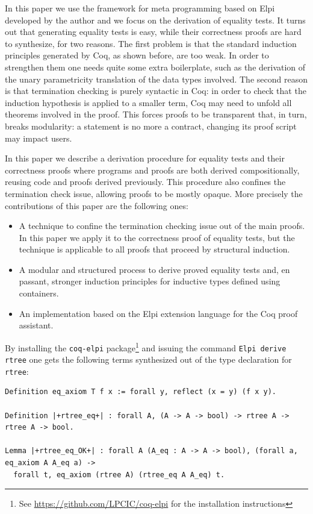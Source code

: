 \documentclass[a4paper,UKenglish,cleveref, autoref]{lipics-v2019}
\begin{document}
In this paper we use the framework for meta programming based on
Elpi~\cite{dunchev:hal-01176856,tassi:hal-01637063} developed by the
author and we focus on the derivation of equality tests.
It turns out that generating equality tests is easy,
while their correctness proofs are hard to synthesize, for two reasons. 
The first problem is that 
the standard induction principles generated by Coq, as shown
before, are too weak. In order to strengthen them one needs quite some extra
boilerplate, such as the derivation of the unary parametricity
translation of the data types involved.
The second reason is that termination checking
is purely syntactic in Coq: %
in order to check that the induction
hypothesis is applied to a smaller term, Coq may need to unfold all
theorems involved in the proof. This forces proofs to
be transparent that, in turn, breaks modularity: a statement is no more a
contract, changing its proof script may impact users.

In this paper we describe a derivation procedure for equality tests
and their correctness proofs
where programs and proofs are both
derived compositionally, reusing code and proofs derived previously.
This procedure also confines the termination check issue,
allowing proofs to be mostly opaque.
More precisely the contributions of this paper are the following ones:
\begin{itemize}
\item A technique to confine the termination checking issue out of the
	main proofs. In this paper we apply it to the correctness
	proof of equality
	tests, but the technique is applicable to all proofs 
	that proceed by structural
	induction.

\item A modular and structured process to derive proved equality tests
		and, en passant, stronger
	induction principles for inductive types defined using
	containers.

\item An implementation based on the Elpi extension language
	for the Coq proof assistant.
\end{itemize}

\noindent
By installing the \lstinline+coq-elpi+
package\footnote{See \url{https://github.com/LPCIC/coq-elpi} for the
installation instructions} 
and issuing the command \lstinline+Elpi derive rtree+
one gets the following terms synthesized
out of the type declaration for \lstinline+rtree+:

\begin{lstlisting}
Definition eq_axiom T f x := forall y, reflect (x = y) (f x y).

Definition |+rtree_eq+| : forall A, (A -> A -> bool) -> rtree A -> rtree A -> bool.

Lemma |+rtree_eq_OK+| : forall A (A_eq : A -> A -> bool), (forall a, eq_axiom A A_eq a) ->
  forall t, eq_axiom (rtree A) (rtree_eq A A_eq) t.
\end{lstlisting}
\end{document}

